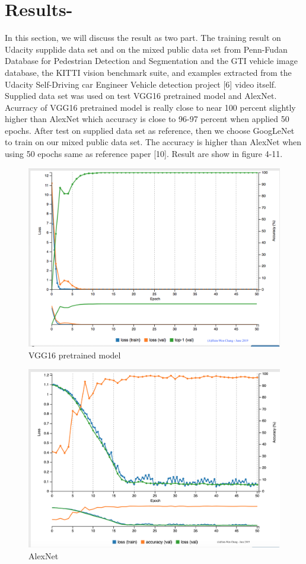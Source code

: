 \documentclass[10pt,journal,compsoc]{IEEEtran}
\begin{document}
\section{Results-}
In this section, we will discuss the result as two part. The training result on Udacity supplide data set and on the mixed public data set from Penn-Fudan Database for Pedestrian Detection and Segmentation and the GTI vehicle image database, the KITTI vision benchmark suite, and examples extracted from the Udacity Self-Driving car Engineer Vehicle detection project [6] video itself. Supplied data set was used on test VGG16 pretrained model and AlexNet. Acurracy of VGG16 pretrained model is really close to near 100 percent slightly higher than AlexNet which accuracy is close to 96-97 percent when applied 50 epochs. After test on supplied data set as reference, then we choose GoogLeNet to train on our mixed public data set. The accuracy is higher than AlexNet when using 50 epochs same as reference paper [10]. Result are show in figure 4-11.
\begin{figure}[thpb]
      \centering
      \includegraphics[width=\linewidth]{VGG16AcurracyLoss.png}
      \caption{VGG16 pretrained model}
      \label{fig:robot1}
\end{figure}
\begin{figure}[thpb]
      \centering
      \includegraphics[width=\linewidth]{AlexNet.png}
      \caption{AlexNet}
      \label{fig:robot1}
\end{figure}
\end{document}
